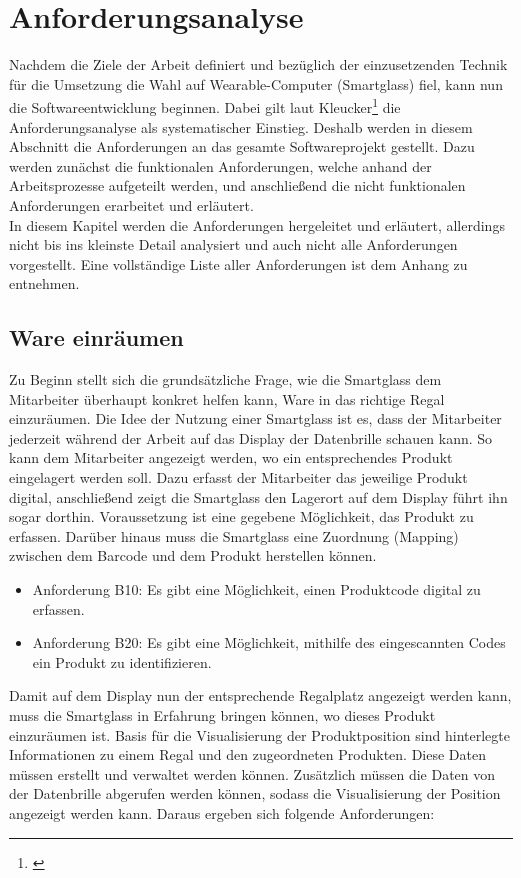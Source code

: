 \chapter{Anforderungsanalyse}
\label{annforderungnsanalyse}
Nachdem die Ziele der Arbeit definiert und bezüglich der einzusetzenden Technik für die Umsetzung die Wahl auf Wearable-Computer (Smartglass) fiel, kann nun die Softwareentwicklung beginnen. Dabei gilt laut Kleucker\footnote{\citep{anforderungsanalyse}} die Anforderungsanalyse als systematischer Einstieg. Deshalb werden in diesem Abschnitt die Anforderungen an das gesamte Softwareprojekt gestellt. Dazu werden zunächst die funktionalen Anforderungen, welche anhand der Arbeitsprozesse aufgeteilt werden, und anschließend die nicht funktionalen Anforderungen erarbeitet und erläutert.\\
In diesem Kapitel werden die Anforderungen hergeleitet und erläutert, allerdings nicht bis ins kleinste Detail analysiert und auch nicht alle Anforderungen vorgestellt. Eine vollständige Liste aller Anforderungen ist dem Anhang zu entnehmen.

\section{Ware einräumen}
Zu Beginn stellt sich die grundsätzliche Frage, wie die Smartglass dem Mitarbeiter überhaupt konkret helfen kann, Ware in das richtige Regal einzuräumen. Die Idee der Nutzung einer Smartglass ist es, dass der Mitarbeiter jederzeit während der Arbeit auf das Display der Datenbrille schauen kann. So kann dem Mitarbeiter angezeigt werden, wo ein entsprechendes Produkt eingelagert werden soll. Dazu erfasst der Mitarbeiter das jeweilige Produkt digital, anschließend zeigt die Smartglass den Lagerort auf dem Display \bzw führt ihn sogar dorthin. Voraussetzung ist eine gegebene Möglichkeit, das Produkt zu erfassen. Darüber hinaus muss die Smartglass eine Zuordnung (Mapping) zwischen dem Barcode und dem Produkt herstellen können.

\begin{itemize}
	\item Anforderung B10: Es gibt eine Möglichkeit, einen Produktcode digital zu erfassen. \label{anforderung_b10}
	\item Anforderung B20: Es gibt eine Möglichkeit, mithilfe des eingescannten Codes ein Produkt zu identifizieren. \label{anforderung_b20}
\end{itemize}

Damit auf dem Display nun der entsprechende Regalplatz angezeigt werden kann, muss die Smartglass in Erfahrung bringen können, wo dieses Produkt einzuräumen ist. Basis für die Visualisierung der Produktposition sind hinterlegte Informationen zu einem Regal und den zugeordneten Produkten. Diese Daten müssen erstellt und verwaltet werden können. Zusätzlich müssen die Daten von der Datenbrille abgerufen werden können, sodass die Visualisierung der Position angezeigt werden kann. Daraus ergeben sich folgende Anforderungen:

